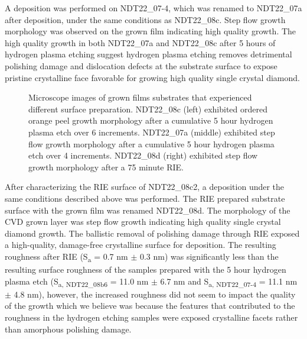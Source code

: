 A deposition was performed on NDT22\_07-4, which was renamed to NDT22\_07a after deposition, under the same conditions as NDT22\_08c. Step flow growth morphology was observed on the grown film indicating high quality growth. The high quality growth in both NDT22\_07a and NDT22\_08c after 5 hours of hydrogen plasma etching suggest hydrogen plasma etching removes detrimental polishing damage and dislocation defects at the substrate surface to expose pristine crystalline face favorable for growing high quality single crystal diamond.


\begin{figure}
    \centering
    
    \caption{Microscope images of grown films substrates that experienced different surface preparation. NDT22\_08c (left) exhibited ordered orange peel growth morphology after a cumulative 5 hour hydrogen plasma etch over 6 increments. NDT22\_07a (middle) exhibited step flow growth morphology after a cumulative 5 hour hydrogen plasma etch over 4 increments. NDT22\_08d (right) exhibited step flow growth morphology after a 75 minute RIE.}
    \label{fig:SurfacePrepGrownFilms}
\end{figure}

After characterizing the RIE surface of NDT22\_08c2, a deposition under the same conditions described above was performed. The RIE prepared substrate surface with the grown film was renamed NDT22\_08d. The morphology of the CVD grown layer was step flow growth indicating high quality single crystal diamond growth. The ballistic removal of polishing damage through RIE exposed a high-quality, damage-free crystalline surface for deposition. The resulting roughness after RIE (S\textsubscript{a} = 0.7 nm $\pm$ 0.3 nm) was significantly less than the resulting surface roughness of the samples prepared with the 5 hour hydrogen plasma etch (S\textsubscript{a, NDT22\_08b6} = 11.0 nm $\pm$ 6.7 nm and S\textsubscript{a, NDT22\_07-4} = 11.1 nm $\pm$ 4.8 nm), however, the increased roughness did not seem to impact the quality of the growth which we believe was because the features that contributed to the roughness in the hydrogen etching samples were exposed crystalline facets rather than amorphous polishing damage.
